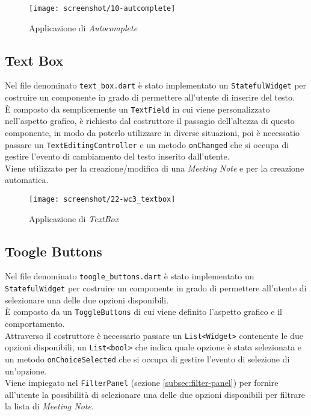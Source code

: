 \begin{figure}[!h] 
    \centering 
    \texttt{[image: screenshot/10-autcomplete]} 
    \caption{Applicazione di \emph{Autocomplete}}
    \label{fig:autocomplete}
\end{figure}

\subsection{Text Box}
\label{subsec:text-box}

Nel file denominato \lstinline{text_box.dart} è stato implementato un \lstinline{StatefulWidget} per costruire un componente in grado di permettere all'utente di inserire del testo.\\
È composto da semplicemente un \lstinline{TextField}\cite{site:text-field} in cui viene personalizzato nell'aspetto grafico, è richiesto dal costruttore il passagio dell'altezza di questo componente, in modo da poterlo utilizzare in diverse situazioni, poi è necessatio passare un \lstinline{TextEditingController}\cite{site:text-editing-controller} e un metodo \lstinline{onChanged} che si occupa di gestire l'evento di cambiamento del testo inserito dall'utente.\\
Viene utilizzato per la creazione/modifica di una \emph{Meeting Note} e per la creazione automatica.

\begin{figure}[!h] 
    \centering 
    \texttt{[image: screenshot/22-wc3\_textbox]} 
    \caption{Applicazione di \emph{TextBox}}
    \label{fig:text-box}
\end{figure}

\subsection{Toogle Buttons}
\label{subsec:toogle-buttons}

Nel file denominato \lstinline{toogle_buttons.dart} è stato implementato un \lstinline{StatefulWidget} per costruire un componente in grado di permettere all'utente di selezionare una delle due opzioni disponibili.\\
È composto da un \lstinline{ToggleButtons}\cite{site:toggle-buttons} di cui viene definito l'aspetto grafico e il comportamento.\\
Attraverso il costruttore è necessario passare un \lstinline{List<Widget>} contenente le due opzioni disponibili, un \lstinline{List<bool>} che indica quale opzione è stata selezionata e un metodo \lstinline{onChoiceSelected} che si occupa di gestire l'evento di selezione di un'opzione.\\
Viene impiegato nel \lstinline{FilterPanel} (sezione \ref{subsec:filter-panel}) per fornire all'utente la possibilità di selezionare una delle due opzioni disponibili per filtrare la lista di \emph{Meeting Note}.

